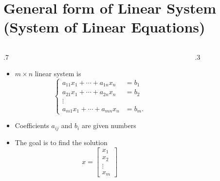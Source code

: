 \documentclass{beamer}
\theoremstyle{definition}
\theoremstyle{theorem}
\begin{document}
\section{General form of Linear System (System of Linear Equations)}
\begin{frame}
\begin{columns}
\begin{column}
 {.7\textwidth}
 \begin{itemize}
 \item $m\times n$ linear system is 
\begin{equation*}
 \label{eq:02}
\left\{
\begin{array}
 {ll}
 a_{11} x_{1} + \cdots + a_{1n} x_{n} &= b_{1} \\
 a_{21} x_{1} + \cdots + a_{2n} x_{n} &= b_{2} \\
 \vdots \\
 a_{m1} x_{1} + \cdots + a_{mn} x_{n} &= b_{m}.
\end{array}
\right.
\end{equation*}
\item Coefficients $a_{ij}$ and $b_{i}$ are given numbers
\item The goal is to find the solution
$$x = 
\begin{bmatrix}
 x_{1}\\ x_{2}\\ \vdots\\ x_{m}
\end{bmatrix}
$$
\end{itemize}

\end{column}
\begin{column}
 {.3\textwidth}
\end{column}
\end{columns}

 
\end{frame}
\end{document}
